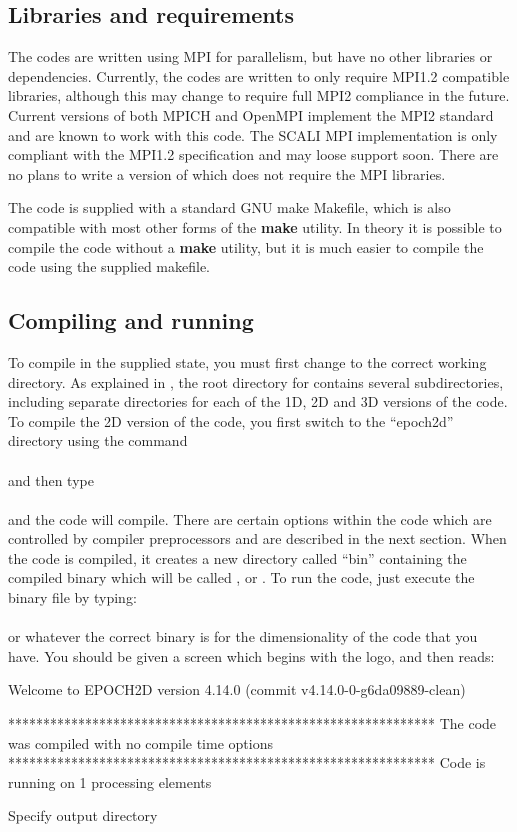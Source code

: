 \subsection{Libraries and requirements}
The {\EPOCH} codes are written using MPI for parallelism, but have no other
libraries or dependencies. Currently, the codes are written to only require
MPI1.2 compatible libraries, although this may change to require full MPI2
compliance in the future. Current versions of both MPICH and OpenMPI implement
the MPI2 standard and are known to work with this code. The SCALI MPI
implementation is only compliant with the MPI1.2 specification and may loose
support soon.
There are no plans to write a version of {\EPOCH} which does not require
the MPI libraries.

The code is supplied with a standard GNU make Makefile, which is also
compatible with most other forms of the {\bf make} utility. In theory it is
possible to compile the code without a {\bf make} utility, but it is much
easier to compile the code using the supplied makefile.

\subsection{\texorpdfstring
  {Compiling and running {\EPOCH}}
  {Compiling and running {EPOCH}}}

To compile {\EPOCH} in the supplied state, you must first change to the
correct working directory. As explained in , the
root directory for {\EPOCH} contains several subdirectories, including
separate directories for each of the 1D, 2D and 3D versions of the code.
To compile the 2D version of the code, you first switch to the ``epoch2d''
directory using the command\\
\indent{}\\
and then type\\
\indent{}\\
and the code will compile. There are certain options within the code which are
controlled by compiler preprocessors and are described in the next
section. When the code is compiled, it creates a new directory called ``bin''
containing the compiled binary which will be called ,
 or . To run the code, just execute the
binary file by typing:\\
\indent{}\\
or whatever the correct binary is for the dimensionality of the code that you
have. You should be given a screen which begins with the {\EPOCH} logo, and then
reads:
\begin{boxverbatim}
 Welcome to EPOCH2D version 4.14.0   (commit v4.14.0-0-g6da09889-clean)

 *************************************************************
 The code was compiled with no compile time options
 *************************************************************
 Code is running on 1 processing elements

 Specify output directory
\end{boxverbatim}

